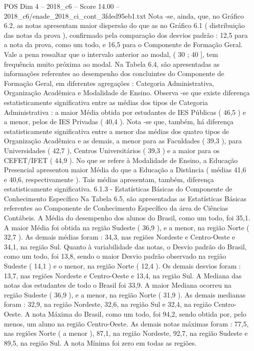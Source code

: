 \begin{textsample}{POS Dim 4 – 2018\_c6 – Score 14.00 – 2018\_c6/enade\_2018\_ci\_cont\_3fded95eb1.txt}
Nota -se, ainda, que, no Gráfico 6.2, as notas apresentam maior dispersão do que as no Gráfico 6.1 ( distribuição das notas da prova ), confirmado pela comparação dos desvios padrão : 12,5 para a nota da prova, como um todo, e 16,5 para o Componente de Formação Geral.
Vale a pena ressaltar que o intervalo anterior ao modal, ( 30 ; 40 ], tem frequência muito próxima ao modal.
Na Tabela 6.4, são apresentadas as informações referentes ao desempenho dos concluintes do Componente de Formação Geral, em diferentes agregações : Categoria Administrativa, Organização Acadêmica e Modalidade de Ensino.
Observa -se que existe diferença estatisticamente significativa entre as médias dos tipos de Categoria Administrativa : a maior Média obtida por estudantes de IES Públicas ( 46,5 ) e a menor, pelos de IES Privadas ( 40,4 ).
Nota -se que, também, há diferença estatisticamente significativa entre a menor das médias dos quatro tipos de Organização Acadêmica e as demais, a menor para as Faculdades ( 39,3 ), para Universidades ( 42,7 ), Centros Universitários ( 39,3 ) e a maior para os CEFET/IFET ( 44,9 ).
No que se refere à Modalidade de Ensino, a Educação Presencial apresentou maior Média do que a Educação a Distância ( médias 41,6 e 40,6, respectivamente ).
Tais médias apresentam, também, diferença estatisticamente significativa. 6.1.3 - Estatísticas Básicas do Componente de Conhecimento Específico Na Tabela 6.5, são apresentadas as Estatísticas Básicas referentes ao Componente de Conhecimento Específico da área de Ciências Contábeis.
A Média do desempenho dos alunos do Brasil, como um todo, foi 35,1.
A maior Média foi obtida na região Sudeste ( 36,9 ), e a menor, na região Norte ( 32,7 ).
As demais médias foram : 34,3, nas regiões Nordeste e Centro-Oeste e 34,1, na região Sul.
Quanto à variabilidade das notas, o Desvio padrão do Brasil, como um todo, foi 13,8, sendo o maior Desvio padrão observado na região Sudeste ( 14,1 ) e o menor, na região Norte ( 12,4 ).
Os demais desvios foram : 13,7, nas regiões Nordeste e Centro-Oeste e 13,4, na região Sul.
A Mediana das notas dos estudantes de todo o Brasil foi 33,9.
A maior Mediana ocorreu na região Sudeste ( 36,9 ), e a menor, na região Norte ( 31,9 ).
As demais medianas foram : 32,9, na região Nordeste, 32,6, na região Sul e 32,4, na região Centro-Oeste.
A nota Máxima do Brasil, como um todo, foi 94,2, sendo obtida por, pelo menos, um aluno na região Centro-Oeste.
As demais notas máximas foram : 77,5, nas regiões Norte ( a menor ), 87,1, na região Nordeste, 92,7, na região Sudeste e 89,5, na região Sul.
A nota Mínima foi zero em todas as regiões.

\end{textsample}

